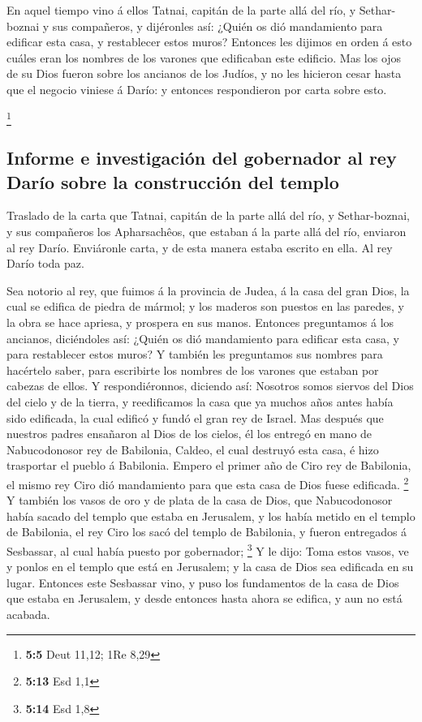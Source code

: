  En aquel tiempo vino á ellos Tatnai, capitán de la parte
allá del río, y Sethar-boznai y sus compañeros, y dijéronles así: ¿Quién
os dió mandamiento para edificar esta casa, y restablecer estos muros?
 Entonces les dijimos en orden á esto cuáles eran los
nombres de los varones que edificaban este edificio.  Mas
los ojos de su Dios fueron sobre los ancianos de los Judíos, y no les
hicieron cesar hasta que el negocio viniese á Darío: y entonces
respondieron por carta sobre esto.

\footnote{\textbf{5:5} Deut 11,12; 1Re 8,29}

\hypertarget{informe-e-investigaciuxf3n-del-gobernador-al-rey-daruxedo-sobre-la-construcciuxf3n-del-templo}{%
\subsection{Informe e investigación del gobernador al rey Darío sobre la
construcción del
templo}\label{informe-e-investigaciuxf3n-del-gobernador-al-rey-daruxedo-sobre-la-construcciuxf3n-del-templo}}

 Traslado de la carta que Tatnai, capitán de la parte allá
del río, y Sethar-boznai, y sus compañeros los Apharsachêos, que estaban
á la parte allá del río, enviaron al rey Darío.  Enviáronle
carta, y de esta manera estaba escrito en ella. Al rey Darío toda paz.

 Sea notorio al rey, que fuimos á la provincia de Judea, á
la casa del gran Dios, la cual se edifica de piedra de mármol; y los
maderos son puestos en las paredes, y la obra se hace apriesa, y
prospera en sus manos.  Entonces preguntamos á los ancianos,
diciéndoles así: ¿Quién os dió mandamiento para edificar esta casa, y
para restablecer estos muros?  Y también les preguntamos
sus nombres para hacértelo saber, para escribirte los nombres de los
varones que estaban por cabezas de ellos.  Y
respondiéronnos, diciendo así: Nosotros somos siervos del Dios del cielo
y de la tierra, y reedificamos la casa que ya muchos años antes había
sido edificada, la cual edificó y fundó el gran rey de Israel.
 Mas después que nuestros padres ensañaron al Dios de los
cielos, él los entregó en mano de Nabucodonosor rey de Babilonia,
Caldeo, el cual destruyó esta casa, é hizo trasportar el pueblo á
Babilonia.  Empero el primer año de Ciro rey de Babilonia,
el mismo rey Ciro dió mandamiento para que esta casa de Dios fuese
edificada. \footnote{\textbf{5:13} Esd 1,1}  Y también los
vasos de oro y de plata de la casa de Dios, que Nabucodonosor había
sacado del templo que estaba en Jerusalem, y los había metido en el
templo de Babilonia, el rey Ciro los sacó del templo de Babilonia, y
fueron entregados á Sesbassar, al cual había puesto por gobernador;
\footnote{\textbf{5:14} Esd 1,8}  Y le dijo: Toma estos
vasos, ve y ponlos en el templo que está en Jerusalem; y la casa de Dios
sea edificada en su lugar.  Entonces este Sesbassar vino, y
puso los fundamentos de la casa de Dios que estaba en Jerusalem, y desde
entonces hasta ahora se edifica, y aun no está acabada.

